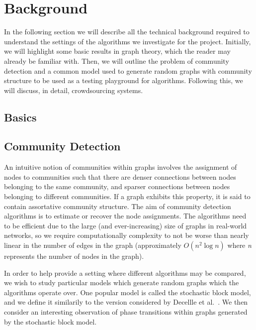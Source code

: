 \documentclass[12pt]{article}
\numberwithin{equation}{section}
\begin{document}

\newpage
\thispagestyle{plain}
\mbox{}
\section {Background}
\label{sec:background}

In the following section we will describe all the technical background required to understand the settings of the algorithms we investigate for the project. Initially, we will highlight some basic results in graph theory, which the reader may already be familiar with. Then, we will outline the problem of community detection and  a common model used to generate random graphs with community structure to be used as a testing playground for algorithms. Following this, we will discuss, in detail, crowdsourcing systems.

\subsection{Basics}
\label{sec:background;subsec:basics}

\subsection{Community Detection}
\label{sec:background;subsec:communityDetection}

An intuitive notion of communities within graphs involves the assignment of nodes to communities such that there are denser connections between nodes belonging to the same community, and sparser connections between nodes belonging to different communities. If a graph exhibits this property, it is said to contain assortative community structure. The aim of community detection algorithms is to estimate or recover the node assignments. The algorithms need to be efficient due to the large (and ever-increasing) size of graphs in real-world networks, so we require computationally complexity to not be worse than nearly linear in the number of edges in the graph (approximately $O(n^{2}\log n)$ where \textsl{n} represents the number of nodes in the graph).

In order to help provide a setting where different algorithms may be compared, we wish to study particular models which generate random graphs which the algorithms operate over. One popular model is called the stochastic block model, and we define it similarily to the version considered by Decellle et al.~\cite{DKM+13}. We then consider an interesting observation of phase transitions within graphs generated by the stochastic block model. 
\end{document}
